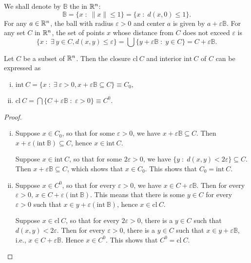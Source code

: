 \documentclass[11pt,a4paper]{article}
\begin{document}
We shall denote by $\mathbb{B}$ the  in $\mathbb{R}^n$:
\begin{equation*}
    \mathbb{B} = \{x\;:\;\|x\|\le 1\} = \{x\;:\; d(x,0)\le 1\}.
\end{equation*}
For any $a\in \mathbb{R}^n$, the ball with radius $\varepsilon>0$ and center $a$ is given by $a+\varepsilon \mathbb{B}$. For any set $C$ in $\mathbb{R}^n$, the set of points $x$ whose distance from $C$ does not exceed $\varepsilon$ is 
\begin{equation*}
    \{x\;:\;\exists\ y\in C, d(x,y)\le \varepsilon\} = \bigcup \{y+\varepsilon \mathbb{B}\;:\;y\in C\} = C + \varepsilon \mathbb{B}.
\end{equation*}

\begin{proposition}\label{prop:closure_interior_formulae}
    Let $C$ be a subset of $\mathbb{R}^n$. Then the closure $\mathrm{cl}\ C$ and interior $\mathrm{int}\ C$ of $C$ can be expressed as 
    \begin{enumerate}[(i)]
        \item $\mathrm{int}\ C = \{x\;:\; \exists\ \varepsilon>0,x+\varepsilon \mathbb{B}\subseteq C\}\equiv C_0,$ 
        \item $\mathrm{cl}\ C = \bigcap \{C+\varepsilon \mathbb{B}\;:\; \varepsilon>0\} \equiv C^0$. 
    \end{enumerate}
\end{proposition}

\begin{proof}
    \begin{enumerate}[(i)]
        \item \converse Suppose $x\in C_0$, so that for some $\varepsilon >0$, we have $x+\varepsilon\mathbb{B} \subseteq C$. Then $x+\varepsilon (\mathrm{int}\ \mathbb{B})\subseteq C$, hence $x\in \mathrm{int}\ C$. 

        \forward Suppose $x\in \mathrm{int}\ C$, so that for some $2 \varepsilon > 0$, we have $\{y\;:\;d(x,y)<2\varepsilon\}\subseteq C$. Then $x+\varepsilon \mathbb{B}\subseteq C$, which shows that $x\in C_0$. This shows that $C_0 = \mathrm{int}\ C$.

        \item \converse Suppose $x\in C^0$, so that for every $\varepsilon>0$, we have $x\in C+\varepsilon \mathbb{B}$. Then for every $\varepsilon>0$, $x\in C+\varepsilon (\mathrm{int}\ \mathbb{B})$. This means that there is some $y\in C$ for every $\varepsilon>0$ such that $x\in y+\varepsilon(\mathrm{int}\ \mathbb{B})$, hence $x\in \mathrm{cl}\ C$.

        \forward Suppose $x\in \mathrm{cl}\ C$, so that for every $2\varepsilon>0$, there is a $y\in C$ such that $d(x,y)<2\varepsilon$. Then for every $\varepsilon>0$, there is a $y\in C$ such that $x\in y+\varepsilon\mathbb{B}$, i.e., $x\in C+\varepsilon\mathbb{B}$. Hence $x\in C^0$. This shows that $C^0 = \mathrm{cl}\ C$.    
    \end{enumerate}
\end{proof}
\end{document}
